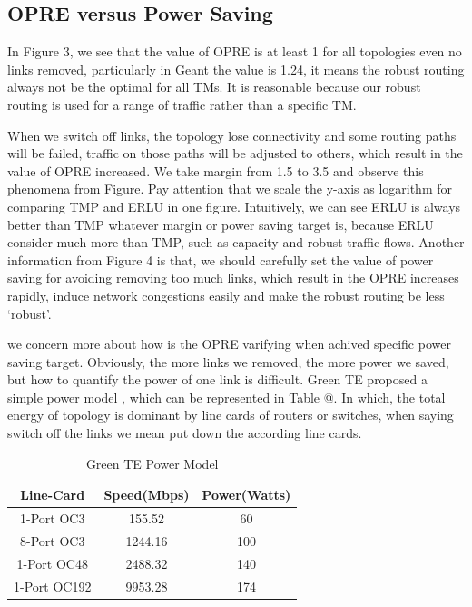 \documentclass[conference]{IEEEtran}
\makeatletter
\newcommand{\Rmnum}[1]{\expandafter\@slowromancap\romannumeral #1@}
\makeatother
\begin{document}
\subsection{OPRE versus Power Saving}
In Figure 3, we see that the value of OPRE is at least 1 for all topologies even no links removed, particularly in Geant the value is 1.24,
it means the robust routing always not be the optimal for all TMs. It is reasonable because our robust routing is used for a range of traffic 
rather than a specific TM.


When we switch off links, the topology lose connectivity and some routing paths will be failed, traffic on those paths will be 
adjusted to others, which result in the value of OPRE increased. We take margin from 1.5 to 3.5 and observe this phenomena from Figure.
Pay attention that we scale the y-axis as logarithm for comparing TMP and ERLU in one figure. Intuitively, we can see ERLU is always
better than TMP whatever margin or power saving target is, because ERLU consider much more than TMP, such as capacity and robust traffic 
flows. Another information from Figure 4 is that, we should carefully set the value of power saving for avoiding removing too much
links, which result in the OPRE increases rapidly, induce network congestions easily and make the robust routing be less `robust'.


we concern more about how is the OPRE varifying when achived specific power saving target. Obviously, the more links we removed, 
the more power we saved, but how to quantify the power of one link is difficult. Green TE proposed a simple power model \cite{networking:greente}, 
which can be represented in Table \Rmnum{2}. In which, the total energy of topology is dominant by line cards of routers or switches, 
when saying switch off the links we mean put down the according line cards.

\begin{table}[!t]
\renewcommand{\arraystretch}{1}
\caption{Green TE Power Model}
\label{power model}
\centering
\begin{tabular}{|c|c|c|}
\hline
\bfseries Line-Card & \bfseries Speed(Mbps) & \bfseries Power(Watts) \\
\hline
1-Port OC3 & 155.52 & 60 \\
\hline
8-Port OC3 & 1244.16 & 100 \\
\hline
1-Port OC48 & 2488.32 & 140 \\
\hline
1-Port OC192 & 9953.28 & 174 \\
\hline
\end{tabular}
\end{table}
\end{document}

